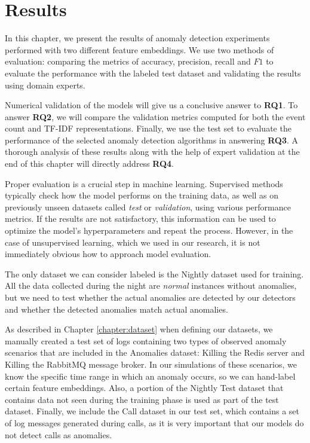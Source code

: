 \chapter{Results}
\label{results}

In this chapter, we present the results of anomaly detection experiments performed with two different feature embeddings. We use two methods of evaluation: comparing the metrics of accuracy, precision, recall and $F1$ to evaluate the performance with the labeled test dataset and validating the results using domain experts.

Numerical validation of the models will give us a conclusive answer to \textbf{RQ1}. To answer \textbf{RQ2}, we will compare the validation metrics computed for both the event count and TF-IDF representations. Finally, we use the test set to evaluate the performance of the selected anomaly detection algorithms in answering \textbf{RQ3}. A thorough analysis of these results along with the help of expert validation at the end of this chapter will directly address \textbf{RQ4}.

Proper evaluation is a crucial step in machine learning. Supervised methods typically check how the model performs on the training data, as well as on previously unseen datasets called \textit{test} or \textit{validation}, using various performance metrics. If the results are not satisfactory, this information can be used to optimize the model's hyperparameters and repeat the process. However, in the case of unsupervised learning, which we used in our research, it is not immediately obvious how to approach model evaluation. 

The only dataset we can consider labeled is the Nightly dataset used for training. All the data collected during the night are \textit{normal} instances without anomalies, but we need to test whether the actual anomalies are detected by our detectors and whether the detected anomalies match actual anomalies. 

As described in Chapter \ref{chapter:dataset} when defining our datasets, we manually created a test set of logs containing two types of observed anomaly scenarios that are included in the Anomalies dataset: Killing the Redis server and Killing the RabbitMQ message broker. In our simulations of these scenarios, we know the specific time range in which an anomaly occurs, so we can hand-label certain feature embeddings. Also, a portion of the Nightly Test dataset that contains data not seen during the training phase is used as part of the test dataset. Finally, we include the Call dataset in our test set, which contains a set of log messages generated during calls, as it is very important that our models do not detect calls as anomalies.

